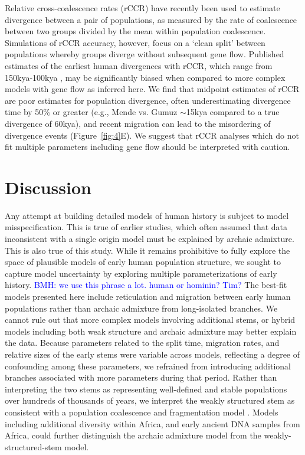 \documentclass[]{article}
\newcommand{\bmhcomment}[1]{{\textcolor{blue}{BMH: #1}}}
\begin{document}
Relative cross-coalescence rates (rCCR) have recently been used to estimate
divergence between a pair of populations, as measured by the rate of
coalescence between two groups divided by the mean within population
coalescence. Simulations of rCCR accuracy, however, focus on a ‘clean split’
between populations whereby groups diverge without subsequent gene flow.
Published estimates of the earliest human divergences with rCCR, which range
from 150kya-100kya \citep{Bergstrom2021-iw}, may be significantly biased when
compared to more complex models with gene flow as inferred here. We find that
midpoint estimates of rCCR are poor estimates for population divergence, often
underestimating divergence time by 50\% or greater (e.g., Mende vs. Gumuz
$\sim$15kya compared to a true divergence of 60kya), and recent migration can
lead to the misordering of divergence events (Figure~\ref{fig:4}E). We suggest
that rCCR analyses which do not fit multiple parameters including gene flow
should be interpreted with caution.

\section*{Discussion}

Any attempt at building detailed models of human history is subject to model
misspecification. This is true of earlier studies, which often assumed that
data inconsistent with a single origin model must be explained by archaic
admixture. This is also true of this study. While it remains prohibitive to
fully explore the space of plausible models of early human population structure,
we sought to capture model uncertainty by exploring multiple parameterizations of
early history.
\bmhcomment{we use this phrase a lot. human or hominin? Tim?}
The best-fit models presented here include reticulation and migration between
early human populations rather than archaic admixture from long-isolated branches.
We cannot rule out that more complex models involving
additional stems, or hybrid models including both weak structure and archaic
admixture may better explain the data. Because parameters related to the split
time, migration rates, and relative sizes of the early stems were variable
across models, reflecting a degree of confounding among these parameters, we
refrained from introducing additional branches associated with more
parameters during that period.
Rather than interpreting the two stems as representing well-defined
and stable populations over hundreds of thousands of years, we interpret the
weakly structured stem as consistent with a population coalescence and
fragmentation model \citep{Scerri2019-xg}.
Models including additional diversity within Africa,
and early ancient DNA samples from Africa, could further distinguish
the archaic admixture model from the weakly-structured-stem model.
\end{document}
